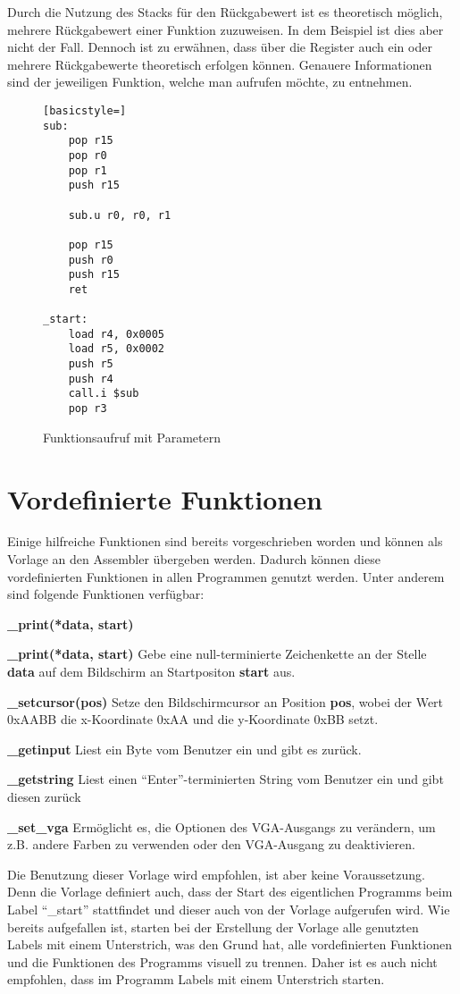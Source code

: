 Durch die Nutzung des Stacks für den Rückgabewert ist es theoretisch möglich,
mehrere Rückgabewert einer Funktion zuzuweisen. In dem Beispiel ist dies aber
nicht der Fall. Dennoch ist zu erwähnen, dass über die Register auch ein oder
mehrere Rückgabewerte theoretisch erfolgen können. Genauere Informationen sind
der jeweiligen Funktion, welche man aufrufen möchte, zu entnehmen.
\begin{figure}[!htb]
\begin{lstlisting}[basicstyle=]
sub:
	pop r15
	pop r0
	pop r1
	push r15

	sub.u r0, r0, r1

	pop r15
	push r0
	push r15
	ret

_start:
	load r4, 0x0005
	load r5, 0x0002
	push r5
	push r4
	call.i $sub
	pop r3
\end{lstlisting}
\caption{Funktionsaufruf mit Parametern}
\label{code:function_parameter}
\end{figure}

\clearpage
\section{Vordefinierte Funktionen}
Einige hilfreiche Funktionen sind bereits vorgeschrieben worden und
können als Vorlage an den Assembler übergeben werden. Dadurch können diese
vordefinierten Funktionen in allen Programmen genutzt werden. Unter anderem sind
folgende Funktionen verfügbar:
\begin{labeling}{\textbf{\_print(*data, start)}}
\item [\textbf{\_print(*data, start)}] Gebe eine null-terminierte Zeichenkette an der
Stelle \textbf{data} auf dem Bildschirm an Startpositon \textbf{start}
aus.
\item [\textbf{\_setcursor(pos)}] Setze den Bildschirmcursor an Position \textbf{pos},
	wobei der Wert 0xAABB die x-Koordinate 0xAA und die y-Koordinate 0xBB setzt.
\item [\textbf{\_getinput}] Liest ein Byte vom Benutzer ein und gibt es zurück.
\item [\textbf{\_getstring}] Liest einen "`Enter"'-terminierten String vom Benutzer ein und
	gibt diesen zurück
\item [\textbf{\_set\_vga}] Ermöglicht es, die Optionen des VGA-Ausgangs zu verändern, um
	z.B. andere Farben zu verwenden oder den VGA-Ausgang zu deaktivieren.
\end{labeling}
Die Benutzung dieser Vorlage wird empfohlen, ist aber keine Voraussetzung. Denn
die Vorlage definiert auch, dass der Start des eigentlichen Programms beim Label
"`\_start"' stattfindet und dieser auch von der Vorlage aufgerufen wird. Wie
bereits aufgefallen ist, starten bei der Erstellung der Vorlage
alle genutzten Labels mit einem Unterstrich, was den Grund hat, alle
vordefinierten Funktionen und die Funktionen des Programms visuell zu trennen.
Daher ist es auch nicht empfohlen, dass im Programm Labels mit einem Unterstrich
starten.
\pagebreak
